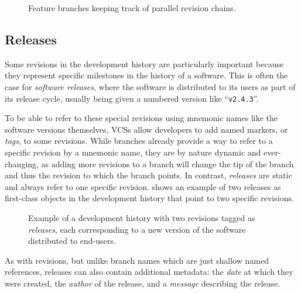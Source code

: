 \begin{figure}[b]
    \centering
    
    \caption{Feature branches keeping track of parallel revision chains.}%
    \label{fig:vcs-rev-branches}
\end{figure}

\subsection{Releases}

Some revisions in the development history are particularly important because
they represent specific milestones in the history of a software. This is often
the case for \emph{software releases}, where the software is distributed to
its users as part of its release cycle, usually being given a numbered version
like ``\texttt{v2.4.3}''.

To be able to refer to these special revisions using mnemonic names like the
software versions themselves, \glspl{VCS} allow developers to add named markers,
or \emph{tags}, to some revisions.
While branches already provide a way to refer to a specific revision by a
mnemonic name, they are by nature dynamic and ever-changing, as adding more
revisions to a branch will change the tip of the branch and thus the revision
to which the branch points. In contrast, \emph{releases} are static and always
refer to one specific revision.
 shows an example of two releases as first-class
objects in the development history that point to two specific revisions.

\begin{figure}
    \centering
    
    \caption{Example of a development history with two revisions tagged as
    \emph{releases}, each corresponding to a new version of the software
    distributed to end-users.}%
    \label{fig:vcs-rel-example}
\end{figure}

As with revisions, but unlike branch names which are just shallow named
references, releases can also contain additional metadata: the \emph{date} at
which they were created, the \emph{author} of the release, and a \emph{message}
describing the release.


